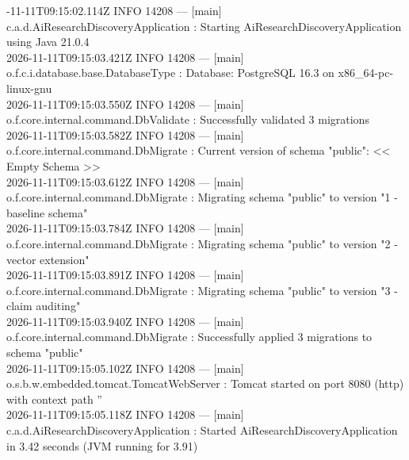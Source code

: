 \documentclass[11pt,a4paper,titlepage]{report}
\begin{document}
\begin{tcolorbox}[colback=white, colframe=primaryTeal, width=\textwidth, arc=3pt, title={Spring Boot 3.3.4 Application Start-up Log}]
\footnotesize{}-11-11T09:15:02.114Z  INFO 14208 --- [main] c.a.d.AiResearchDiscoveryApplication    : Starting AiResearchDiscoveryApplication using Java 21.0.4\\
2026-11-11T09:15:03.421Z  INFO 14208 --- [main] o.f.c.i.database.base.DatabaseType      : Database: PostgreSQL 16.3 on x86_64-pc-linux-gnu\\
2026-11-11T09:15:03.550Z  INFO 14208 --- [main] o.f.core.internal.command.DbValidate    : Successfully validated 3 migrations\\
2026-11-11T09:15:03.582Z  INFO 14208 --- [main] o.f.core.internal.command.DbMigrate     : Current version of schema "public": << Empty Schema >>\\
2026-11-11T09:15:03.612Z  INFO 14208 --- [main] o.f.core.internal.command.DbMigrate     : Migrating schema "public" to version "1 - baseline schema"\\
2026-11-11T09:15:03.784Z  INFO 14208 --- [main] o.f.core.internal.command.DbMigrate     : Migrating schema "public" to version "2 - vector extension"\\
2026-11-11T09:15:03.891Z  INFO 14208 --- [main] o.f.core.internal.command.DbMigrate     : Migrating schema "public" to version "3 - claim auditing"\\
2026-11-11T09:15:03.940Z  INFO 14208 --- [main] o.f.core.internal.command.DbMigrate     : Successfully applied 3 migrations to schema "public"\\
2026-11-11T09:15:05.102Z  INFO 14208 --- [main] o.s.b.w.embedded.tomcat.TomcatWebServer : Tomcat started on port 8080 (http) with context path ''\\
2026-11-11T09:15:05.118Z  INFO 14208 --- [main] c.a.d.AiResearchDiscoveryApplication    : Started AiResearchDiscoveryApplication in 3.42 seconds (JVM running for 3.91)
\end{tcolorbox}
\vspace{-2pt}
\label{fig:startup_log}
\vspace{6pt}
\end{document}
